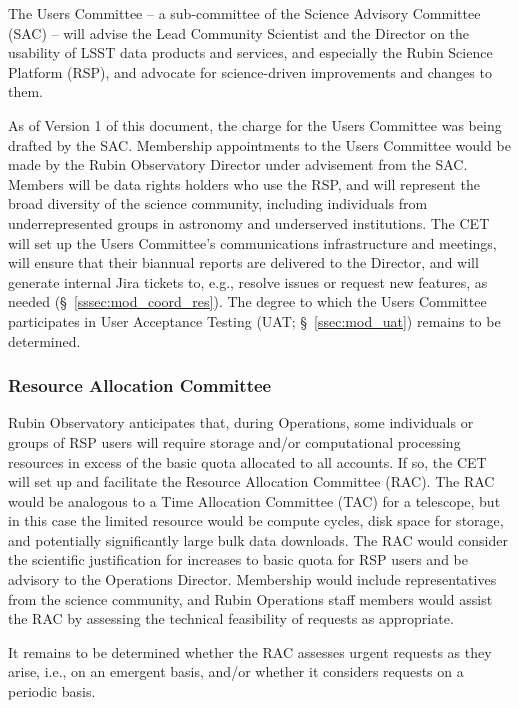 \documentclass[DM,lsstdraft,toc]{lsstdoc}
\begin{document}
The Users Committee -- a sub-committee of the Science Advisory Committee (SAC) -- will advise the Lead Community Scientist and the Director on the usability of LSST data products and services, and especially the Rubin Science Platform (RSP), and advocate for science-driven improvements and changes to them.

As of Version 1 of this document, the charge for the Users Committee was being drafted by the SAC.
Membership appointments to the Users Committee would be made by the Rubin Observatory Director under advisement from the SAC.
Members will be data rights holders who use the RSP, and will represent the broad diversity of the science community, including individuals from underrepresented groups in astronomy and underserved institutions.
The CET will set up the Users Committee's communications infrastructure and meetings, will ensure that their biannual reports are delivered to the Director, and will generate internal Jira tickets to, e.g., resolve issues or request new features, as needed (\S~\ref{sssec:mod_coord_res}).
The degree to which the Users Committee participates in User Acceptance Testing (UAT; \S~\ref{ssec:mod_uat}) remains to be determined.


\subsubsection{Resource Allocation Committee}\label{sssec:mod_coord_rac}

Rubin Observatory anticipates that, during Operations, some individuals or groups of RSP users will require storage and/or computational processing resources in excess of the basic quota allocated to all accounts.
If so, the CET will set up and facilitate the Resource Allocation Committee (RAC).
The RAC would be analogous to a Time Allocation Committee (TAC) for a telescope, but in this case the limited resource would be compute cycles, disk space for storage, and potentially significantly large bulk data downloads.
The RAC would consider the scientific justification for increases to basic quota for RSP users and be advisory to the Operations Director.
Membership would include representatives from the science community, and Rubin Operations staff members would assist the RAC by assessing the technical feasibility of requests as appropriate.

It remains to be determined whether the RAC assesses urgent requests as they arise, i.e., on an emergent basis, and/or whether it considers requests on a periodic basis.
\end{document}
